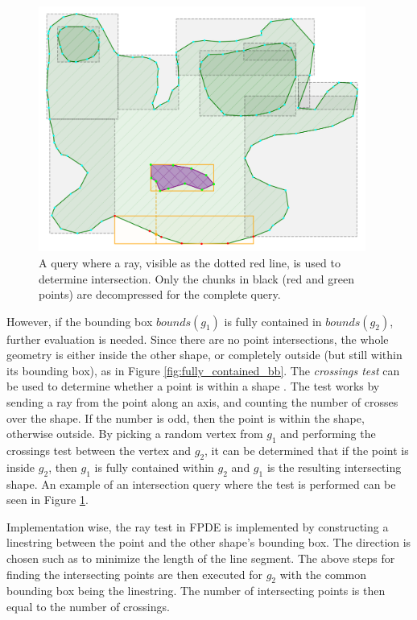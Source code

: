 \begin{figure}[htb]
    \centering
    \includegraphics[width=10.75cm]{images/intersecting_ray.png}
    \caption{A query where a ray, visible as the dotted red line, is used to determine intersection. Only the chunks in black (red and green points) are decompressed for the complete query.}
    \label{fig:intray}
\end{figure}

\label{sec:pointinshape}
However, if the bounding box $bounds(g_1)$ is fully contained in $bounds(g_2)$, further evaluation is needed. Since there are no point intersections, the whole geometry is either inside the other shape, or completely outside (but still within its bounding box), as in Figure \ref{fig:fully_contained_bb}. The \emph{crossings test} can be used to determine whether a point is within a shape \cite{polygonalgos}. The test works by sending a ray from the point along an axis, and counting the number of crosses over the shape. If the number is odd, then the point is within the shape, otherwise outside. By picking a random vertex from $g_1$ and performing the crossings test between the vertex and $g_2$, it can be determined that if the point is inside $g_2$, then $g_1$ is fully contained within $g_2$ and $g_1$ is the resulting intersecting shape. An example of an intersection query where the test is performed can be seen in Figure \ref{fig:intray}.


Implementation wise, the ray test in FPDE is implemented by constructing a linestring between the point and the other shape's bounding box. The direction is chosen such as to minimize the length of the line segment. The above steps for finding the intersecting points are then executed for $g_2$ with the common bounding box being the linestring. The number of intersecting points is then equal to the number of crossings.

